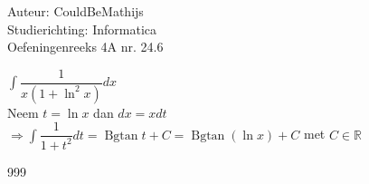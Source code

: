 \documentclass[a4paper]{article}
\newcommand{\intt}{\displaystyle\int}
\newcommand{\Bgtan}{\operatorname{Bgtan}}
\begin{document}
  
\noindent \large Auteur: CouldBeMathijs \\
\noindent \large Studierichting: Informatica\\
\noindent \large Oefeningenreeks 4A nr. 24.6\\

\medskip

\normalsize

$\intt \dfrac{1}{x(1+\ln^2x)}dx$\\

Neem $t = \ln x$ dan $dx = xdt$\\

$\Rightarrow \intt \dfrac{1}{1+t^2}dt = \Bgtan t + C = \Bgtan (\ln x) + C$ met $C \in \mathbb{R}$\\

\begin{thebibliography}{999}
\end{thebibliography}
\end{document}
